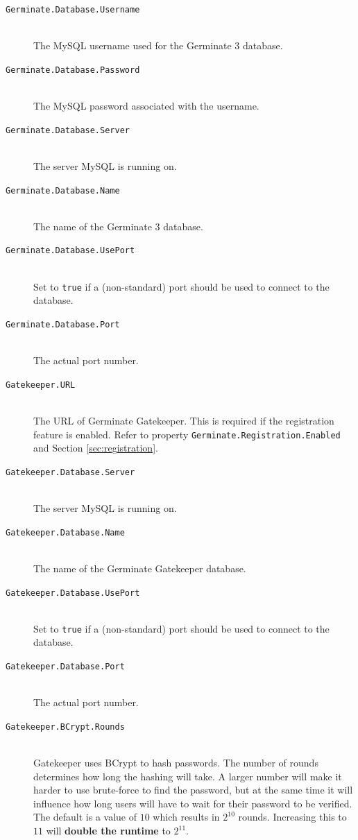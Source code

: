 \label{sec:config-properties}
\begin{description}
	\item[\texttt{Germinate.Database.Username}\nonoptional] \floatright{[String]}\\The MySQL username used for the Germinate 3 database.
	\item[\texttt{Germinate.Database.Password}\nonoptional] \floatright{[String]}\\The MySQL password associated with the username.
	\item[\texttt{Germinate.Database.Server}\nonoptional] \floatright{[String]}\\The server MySQL is running on.
	\item[\texttt{Germinate.Database.Name}\nonoptional] \floatright{[String]}\\The name of the Germinate 3 database.
	\item[\texttt{Germinate.Database.UsePort}] \\Set to \texttt{true} if a (non-standard) port should be used to connect to the database.
	\item[\texttt{Germinate.Database.Port}\nonoptionalif] \floatright{[$x\in\{0,\dots,49151\}$]}\\The actual port number.
	\item[\texttt{Gatekeeper.URL}\nonoptionalif] \floatright{[URL]}\\The URL of Germinate Gatekeeper. This is required if the registration feature is enabled. Refer to property \texttt{Germinate.Registration.Enabled} and Section \ref{sec:registration}.
	\item[\texttt{Gatekeeper.Database.Server}\nonoptionalif] \floatright{[String]}\\The server MySQL is running on.
	\item[\texttt{Gatekeeper.Database.Name}\nonoptionalif] \floatright{[String]}\\The name of the Germinate Gatekeeper database.
	\item[\texttt{Gatekeeper.Database.UsePort}] \\Set to \texttt{true} if a (non-standard) port should be used to connect to the database.
	\item[\texttt{Gatekeeper.Database.Port}\nonoptionalif] \floatright{[$x\in\{0,\dots,49151\}$]}\\The actual port number.
    \item[\texttt{Gatekeeper.BCrypt.Rounds}] \\Gatekeeper uses BCrypt to hash passwords. The number of rounds determines how long the hashing will take. A larger number will make it harder to use brute-force to find the password, but at the same time it will influence how long users will have to wait for their password to be verified. The default is a value of $10$ which results in $2^{10}$ rounds. Increasing this to $11$ will \textbf{double the runtime} to $2^{11}$.

\end{description}
